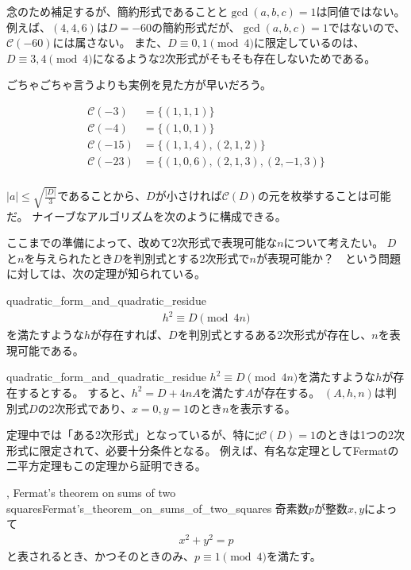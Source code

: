 念のため補足するが、簡約形式であることと$\gcd(a,b,c)=1$は同値ではない。
例えば、$(4,4,6)$は$D=-60$の簡約形式だが、$\gcd(a,b,c)=1$ではないので、$\mathcal{C}(-60)$には属さない。
また、$D\equiv0,1\pmod{4}$に限定しているのは、$D\equiv3,4\pmod{4}$になるような2次形式がそもそも存在しないためである。

ごちゃごちゃ言うよりも実例を見た方が早いだろう。

\begin{align*}
\mathcal{C}(-3) &= \{(1,1,1)\}\\
\mathcal{C}(-4) &= \{(1,0,1)\}\\
\mathcal{C}(-15) &= \{(1,1,4), (2,1,2)\}\\
\mathcal{C}(-23) &= \{(1,0,6), (2,1,3), (2,-1,3)\}\\
\end{align*}

$|a| \le \sqrt{\frac{|D|}{3}}$であることから、$D$が小さければ$\mathcal{C}(D)$の元を枚挙することは可能だ。
ナイーブなアルゴリズムを次のように構成できる。


ここまでの準備によって、改めて2次形式で表現可能な$n$について考えたい。
$D$と$n$を与えられたとき$D$を判別式とする2次形式で$n$が表現可能か？　という問題に対しては、次の定理が知られている。

\begin{Theo}{}{quadratic_form_and_quadratic_residue}
\begin{align*}
h^2 \equiv D \pmod{4n}
\end{align*}
を満たすような$h$が存在すれば、$D$を判別式とするある2次形式が存在し、$n$を表現可能である。
\end{Theo}

\begin{thProof}{quadratic_form_and_quadratic_residue}
$h^2 \equiv D \pmod{4n}$を満たすような$h$が存在するとする。
すると、$h^2 = D + 4nA$を満たす$A$が存在する。
$(A,h,n)$は判別式$D$の2次形式であり、$x=0,y=1$のとき$n$を表示する。
\end{thProof}

定理中では「ある2次形式」となっているが、特に$\sharp\mathcal{C}(D)=1$のときは1つの2次形式に限定されて、必要十分条件となる。
例えば、有名な定理としてFermatの二平方定理もこの定理から証明できる。

\begin{Theo}{, Fermat's theorem on sums of two squares}{Fermat's_theorem_on_sums_of_two_squares}
奇素数$p$が整数$x,y$によって
\begin{align*}
x^2 + y^2 = p
\end{align*}
と表されるとき、かつそのときのみ、$p\equiv1\pmod{4}$を満たす。
\end{Theo}

